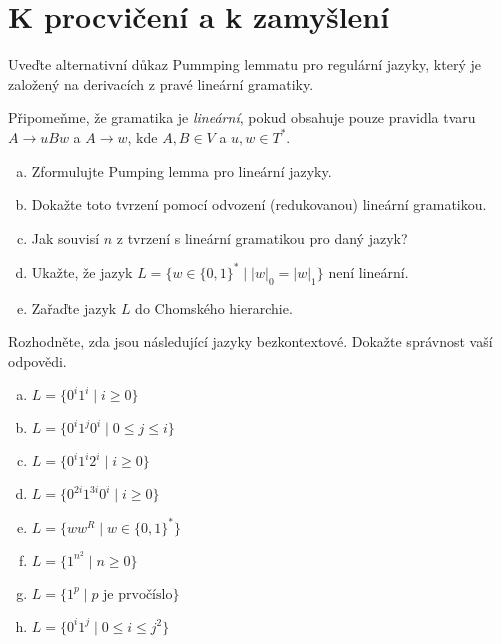\documentclass[a4paper,12pt]{amsart}
\begin{document}
\section*{K procvičení a k zamyšlení}


\medskip\begin{problem}

    Uveďte alternativní důkaz Pummping lemmatu pro regulární jazyky, který je založený na derivacích z pravé lineární gramatiky.

\end{problem}


\medskip\begin{problem}
    
    Připomeňme, že gramatika je \emph{lineární}, pokud obsahuje pouze pravidla tvaru $A\to uBw$ a $A\to w$, kde $A,B\in V$ a $u,w\in T^*$.
        
    \begin{enumerate}[(a)]
        \setlength\itemsep{6pt}
        \item Zformulujte Pumping lemma pro lineární jazyky.
        \item Dokažte toto tvrzení pomocí odvození (redukovanou) lineární gramatikou.
        \item Jak souvisí $n$ z tvrzení s lineární gramatikou pro daný jazyk?
        \item Ukažte, že jazyk $L=\{w\in \{0,1\}^*\mid |w|_0=|w|_1\}$ není lineární.
        \item Zařaďte jazyk $L$ do Chomského hierarchie.
    \end{enumerate}    
        
\end{problem}


\medskip\begin{problem}

    Rozhodněte, zda jsou následující jazyky bezkontextové. Dokažte správnost vaší odpovědi.

    \medskip
    
    \begin{enumerate}[(a)]
        \setlength\itemsep{6pt}
        \item $L=\{0^i1^i\mid i\geq 0\}$        
        \item $L=\{0^i1^j0^i\mid 0\leq j\leq i\}$
        \item $L=\{0^i1^i2^i\mid i\geq 0\}$
        \item $L=\{0^{2i}1^{3i}0^i\mid i\geq 0\}$        
        \item $L=\{ww^R\mid w\in \{0,1\}^*\}$        
        \item $L=\{1^{n^2}\mid n\geq 0\}$        
        \item $L=\{1^p\mid p \text{ je prvočíslo}\}$
        \item $L=\{0^i1^{j}\mid 0\leq i\leq j^2\}$
    \end{enumerate}

\end{problem}
\end{document}
